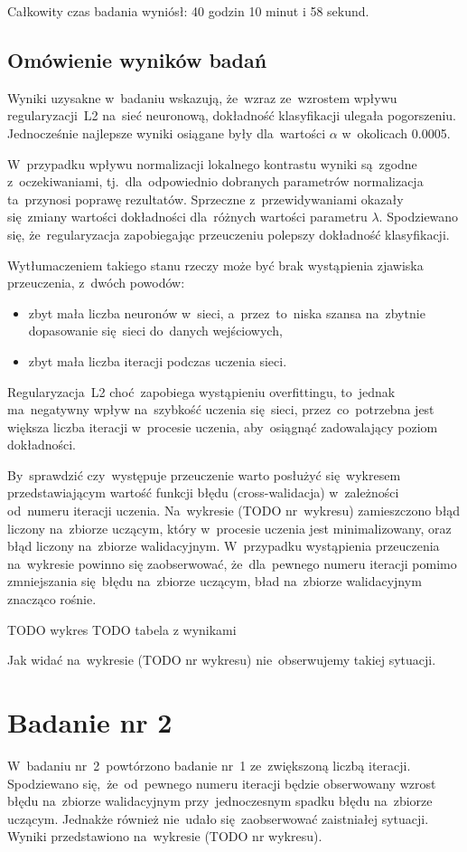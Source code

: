 Całkowity czas badania wyniósł: 40 godzin 10 minut i 58 sekund.

\subsection{Omówienie wyników badań}
Wyniki uzysakne w~badaniu wskazują, że~wzraz ze~wzrostem wpływu regularyzacji~L2 na~sieć neuronową, dokładność
klasyfikacji ulegała pogorszeniu. Jednocześnie najlepsze wyniki osiągane były dla~wartości $\alpha$ w~okolicach 0.0005.

W~przypadku wpływu normalizacji lokalnego kontrastu wyniki są~zgodne z~oczekiwaniami, tj.~dla~odpowiednio dobranych
parametrów normalizacja ta~przynosi poprawę rezultatów. Sprzeczne z~przewidywaniami okazały się~zmiany wartości
dokładności dla~różnych wartości parametru $\lambda$. Spodziewano się, że~regularyzacja zapobiegając przeuczeniu
polepszy dokładność klasyfikacji.

Wytłumaczeniem takiego stanu rzeczy może być brak wystąpienia zjawiska przeuczenia, z~dwóch powodów:
\begin{itemize}
    \item zbyt mała liczba neuronów w~sieci, a~przez~to~niska szansa na~zbytnie dopasowanie się~sieci do~danych
          wejściowych,
    \item zbyt mała liczba iteracji podczas uczenia sieci.
\end{itemize}
Regularyzacja~L2 choć~zapobiega wystąpieniu overfittingu, to~jednak ma~negatywny wpływ na~szybkość uczenia się~sieci,
przez~co~potrzebna jest większa liczba iteracji w~procesie uczenia, aby~osiągnąć zadowalający poziom dokładności.

By~sprawdzić czy~występuje przeuczenie warto posłużyć się~wykresem przedstawiającym wartość funkcji
błędu (cross-walidacja) w~zależności od~numeru iteracji uczenia. Na~wykresie (TODO nr~wykresu) zamieszczono
błąd liczony na~zbiorze uczącym, który w~procesie uczenia jest minimalizowany, oraz błąd liczony na~zbiorze
walidacyjnym. W~przypadku wystąpienia przeuczenia na~wykresie powinno się zaobserwować, że~dla~pewnego numeru
iteracji pomimo zmniejszania się~błędu na~zbiorze uczącym, bład na~zbiorze walidacyjnym znacząco rośnie.

TODO wykres
TODO tabela z wynikami

Jak widać na~wykresie (TODO nr wykresu) nie~obserwujemy takiej sytuacji.

\section{Badanie nr 2}
W~badaniu nr~2~powtórzono badanie nr~1 ze~zwiększoną liczbą iteracji. Spodziewano się,~że~od~pewnego numeru
iteracji będzie obserwowany wzrost błędu na~zbiorze walidacyjnym przy~jednoczesnym spadku błędu na~zbiorze uczącym.
Jednakże również nie~udało się~zaobserwować zaistniałej sytuacji. Wyniki przedstawiono na~wykresie (TODO nr wykresu).

